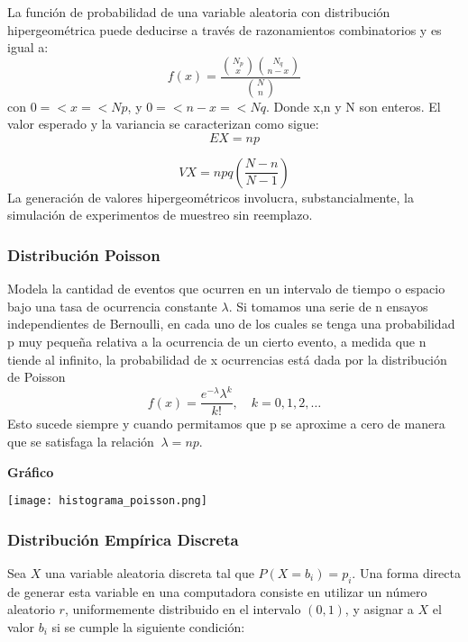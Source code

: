 \documentclass[11pt]{article}
\begin{document}
La función de probabilidad de una variable aleatoria con distribución hipergeométrica puede deducirse a través de razonamientos combinatorios y es igual a:
\begin{equation}
    f(x) = \frac{\binom{N_{p}}{x}\binom{N_{q}}{n-x}}{\binom{N}{n}}
    \end{equation}
  con $0 =< x =< Np$, y $0 =< n-x =<Nq$. Donde x,n y N son enteros. El valor esperado y la variancia se caracterizan como sigue:
  \begin{equation}
    EX = np
    \end{equation}

  \begin{equation}
    VX = npq(\frac{N-n}{N-1})
    \end{equation}
  La generación de valores hipergeométricos involucra, substancialmente, la simulación de experimentos de muestreo sin reemplazo.


\subsubsection{Distribución Poisson}
Modela la cantidad de eventos que ocurren en un intervalo de tiempo o espacio bajo una tasa de ocurrencia constante \( \lambda \).
 Si tomamos una serie de n ensayos independientes de Bernoulli, en cada uno de los cuales se tenga una probabilidad p muy pequeña relativa a la ocurrencia de un cierto evento,
  a medida que n tiende al infinito, la probabilidad de x ocurrencias está dada por la distribución de Poisson
  \begin{equation}
    f(x) = \frac{e^{-\lambda} \lambda^k}{k!}, \quad k = 0, 1, 2, \ldots
    \end{equation}
Esto sucede siempre y cuando permitamos que p se aproxime a cero de manera que se satisfaga la relación \(\ \lambda = np. \)\

\noindent\textbf{Gráfico\newline}
\begin{center}
\texttt{[image: histograma\_poisson.png]}
\end{center}

\subsubsection{Distribución Empírica Discreta}
Sea \( X \) una variable aleatoria discreta tal que \( P(X = b_i) = p_i \).  
Una forma directa de generar esta variable en una computadora consiste en utilizar un número aleatorio \( r \), uniformemente distribuido en el intervalo \( (0, 1) \), y asignar a \( X \) el valor \( b_i \) si se cumple la siguiente condición:
\end{document}
